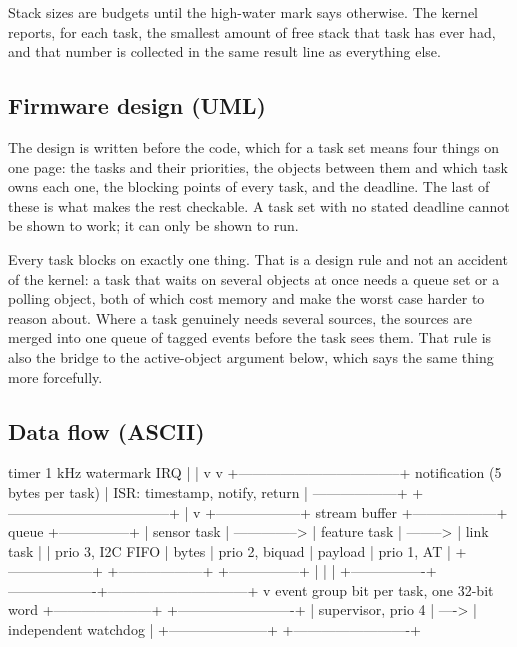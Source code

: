 Stack sizes are budgets until the high-water mark says otherwise. The kernel
reports, for each task, the smallest amount of free stack that task has ever
had, and that number is collected in the same result line as everything else.

\subsection*{Firmware design (UML)}


The design is written before the code, which for a task set means four things
on one page: the tasks and their priorities, the objects between them and which
task owns each one, the blocking points of every task, and the deadline. The
last of these is what makes the rest checkable. A task set with no stated
deadline cannot be shown to work; it can only be shown to run.

Every task blocks on exactly one thing. That is a design rule and not an
accident of the kernel: a task that waits on several objects at once needs a
queue set or a polling object, both of which cost memory and make the worst
case harder to reason about. Where a task genuinely needs several sources, the
sources are merged into one queue of tagged events before the task sees them.
That rule is also the bridge to the active-object argument below, which says
the same thing more forcefully.

\subsection*{Data flow (ASCII)}

\begin{asciiart}
   timer 1 kHz            watermark IRQ
        |                      |
        v                      v
  +-----------------------------------+   notification (5 bytes per task)
  |  ISR: timestamp, notify, return   | ------------------+
  +-----------------------------------+                   |
                                                           v
  +------------------+  stream buffer  +------------------+   queue   +---------------+
  | sensor task      | --------------> | feature task     | --------> | link task     |
  | prio 3, I2C FIFO |   bytes         | prio 2, biquad   |  payload  | prio 1, AT    |
  +------------------+                 +------------------+           +---------------+
        |                                    |                              |
        +----------------+-------------------+------------------------------+
                         v  event group bit per task, one 32-bit word
                  +---------------------+       +-------------------------+
                  | supervisor, prio 4  | ----> | independent watchdog    |
                  +---------------------+       +-------------------------+
\end{asciiart}


